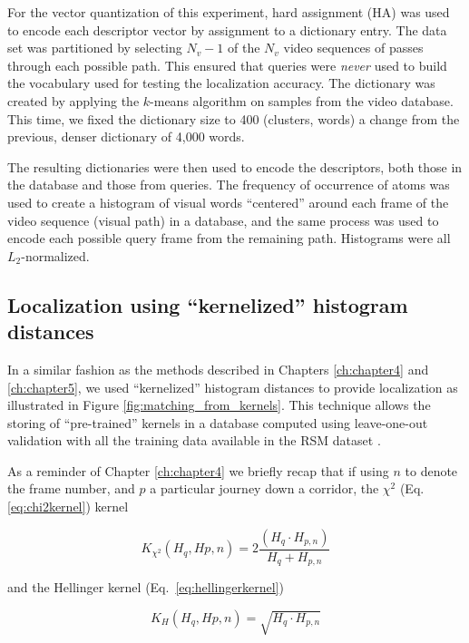 For the vector quantization of this experiment, hard assignment (HA) was used to encode each descriptor vector by assignment to a dictionary entry. The data set was partitioned by selecting $N_v-1$ of the $N_v$ video sequences of passes through each possible path. This ensured that queries were {\em never} used to build the vocabulary used for testing the localization accuracy. The dictionary was created by applying the $k$-means algorithm on samples from the video database. This time, we fixed the dictionary size to 400 (clusters, words) a change from the previous, denser dictionary of 4,000 words.

The resulting dictionaries were then used to encode the descriptors, both those in the database and those from queries.  The frequency of occurrence of atoms was used to create a histogram of visual words ``centered'' around each frame of the video sequence (visual path) in a database, and the same process was used to encode each possible query frame from the remaining path. Histograms were all $L_2$-normalized.

\subsection{Localization using ``kernelized'' histogram distances}
\label{sec:methods}

In a similar fashion as the methods described in Chapters \ref{ch:chapter4} and \ref{ch:chapter5}, we used ``kernelized'' histogram distances  to provide localization as illustrated in Figure \ref{fig:matching_from_kernels}. This technique allows the storing of ``pre-trained'' kernels in a database computed using leave-one-out validation with all the training data available in the RSM dataset \citep{Rivera-RubioRSM}.

As a reminder of Chapter \ref{ch:chapter4} we briefly recap that if using $n$ to denote the frame number, and $p$ a particular journey down a corridor, the 
$\chi^2$ (Eq.\ref{eq:chi2kernel}) kernel

\begin{equation}
K_{\chi^2}(H_q, H{p,n}) =  2 \frac{(H_q \cdot H_{p,n})}{H_q+H_{p,n}}
\label{eq:chi2kernel}
\end{equation}

and the Hellinger kernel (Eq.~\ref{eq:hellingerkernel})

\begin{equation}
K_{H}(H_q, H{p,n}) =  \sqrt{H_q \cdot H_{p,n}}
\label{eq:hellingerkernel}
\end{equation}


